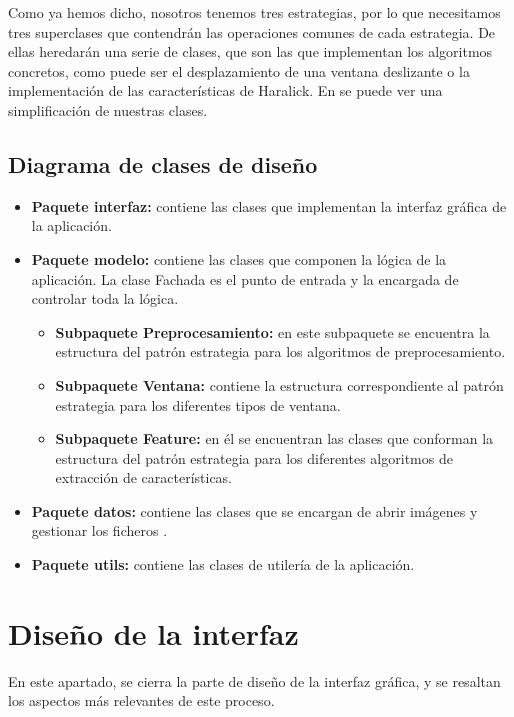 Como ya hemos dicho, nosotros tenemos tres estrategias, por lo que necesitamos tres superclases que contendrán las operaciones comunes de cada estrategia. De ellas heredarán una serie de clases, que son las que implementan los algoritmos concretos, como puede ser el desplazamiento de una ventana deslizante o la implementación de las características de Haralick. En  se puede ver una simplificación de nuestras clases.


\newpage

\subsection{Diagrama de clases de diseño}


\begin{itemize}
\item \textbf{Paquete interfaz:} contiene las clases que implementan la interfaz gráfica de la aplicación.
\item \textbf{Paquete modelo:} contiene las clases que componen la lógica de la aplicación. La clase Fachada es el punto de entrada y la encargada de controlar toda la lógica.
	\begin{itemize}
	\item \textbf{Subpaquete Preprocesamiento:} en este subpaquete se encuentra la estructura del patrón estrategia para los algoritmos de preprocesamiento.
	\item \textbf{Subpaquete Ventana:} contiene la estructura correspondiente al patrón estrategia para los diferentes tipos de ventana.
	\item \textbf{Subpaquete Feature:} en él se encuentran las clases que conforman la estructura del patrón estrategia para los diferentes algoritmos de extracción de características.
	\end{itemize}
\item \textbf{Paquete datos:} contiene las clases que se encargan de abrir imágenes y gestionar los ficheros \arff{}.
\item \textbf{Paquete utils:} contiene las clases de utilería de la aplicación.
\end{itemize}


\section{Diseño de la interfaz}
En este apartado, se cierra la parte de diseño de la interfaz gráfica, y se resaltan los aspectos más relevantes de este proceso.

